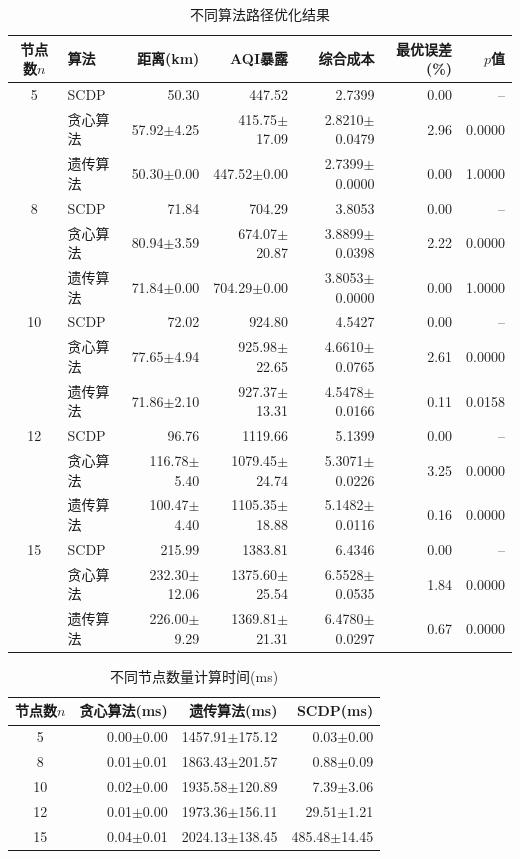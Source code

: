 
\begin{table}[htbp]
\centering
\caption{不同算法路径优化结果}
\label{tab:opt_results}
\begin{tabular}{clrrrrr}
\hline
节点数$n$ & 算法 & 距离(km) & AQI暴露 & 综合成本 & 最优误差(\%) & $p$值 \\
\hline
5 & SCDP & 50.30 & 447.52 & 2.7399 & 0.00 & -- \\
 & 贪心算法 & 57.92$\pm$4.25 & 415.75$\pm$17.09 & 2.8210$\pm$0.0479 & 2.96 & 0.0000 \\
 & 遗传算法 & 50.30$\pm$0.00 & 447.52$\pm$0.00 & 2.7399$\pm$0.0000 & 0.00 & 1.0000 \\
\hline
8 & SCDP & 71.84 & 704.29 & 3.8053 & 0.00 & -- \\
 & 贪心算法 & 80.94$\pm$3.59 & 674.07$\pm$20.87 & 3.8899$\pm$0.0398 & 2.22 & 0.0000 \\
 & 遗传算法 & 71.84$\pm$0.00 & 704.29$\pm$0.00 & 3.8053$\pm$0.0000 & 0.00 & 1.0000 \\
\hline
10 & SCDP & 72.02 & 924.80 & 4.5427 & 0.00 & -- \\
 & 贪心算法 & 77.65$\pm$4.94 & 925.98$\pm$22.65 & 4.6610$\pm$0.0765 & 2.61 & 0.0000 \\
 & 遗传算法 & 71.86$\pm$2.10 & 927.37$\pm$13.31 & 4.5478$\pm$0.0166 & 0.11 & 0.0158 \\
\hline
12 & SCDP & 96.76 & 1119.66 & 5.1399 & 0.00 & -- \\
 & 贪心算法 & 116.78$\pm$5.40 & 1079.45$\pm$24.74 & 5.3071$\pm$0.0226 & 3.25 & 0.0000 \\
 & 遗传算法 & 100.47$\pm$4.40 & 1105.35$\pm$18.88 & 5.1482$\pm$0.0116 & 0.16 & 0.0000 \\
\hline
15 & SCDP & 215.99 & 1383.81 & 6.4346 & 0.00 & -- \\
 & 贪心算法 & 232.30$\pm$12.06 & 1375.60$\pm$25.54 & 6.5528$\pm$0.0535 & 1.84 & 0.0000 \\
 & 遗传算法 & 226.00$\pm$9.29 & 1369.81$\pm$21.31 & 6.4780$\pm$0.0297 & 0.67 & 0.0000 \\
\hline
\end{tabular}
\end{table}

\begin{table}[htbp]
\centering
\caption{不同节点数量计算时间(ms)}
\label{tab:compute_time}
\begin{tabular}{crrr}
\hline
节点数$n$ & 贪心算法(ms) & 遗传算法(ms) & SCDP(ms) \\
\hline
5 & 0.00$\pm$0.00 & 1457.91$\pm$175.12 & 0.03$\pm$0.00 \\
8 & 0.01$\pm$0.01 & 1863.43$\pm$201.57 & 0.88$\pm$0.09 \\
10 & 0.02$\pm$0.00 & 1935.58$\pm$120.89 & 7.39$\pm$3.06 \\
12 & 0.01$\pm$0.00 & 1973.36$\pm$156.11 & 29.51$\pm$1.21 \\
15 & 0.04$\pm$0.01 & 2024.13$\pm$138.45 & 485.48$\pm$14.45 \\
\hline
\end{tabular}
\end{table}

